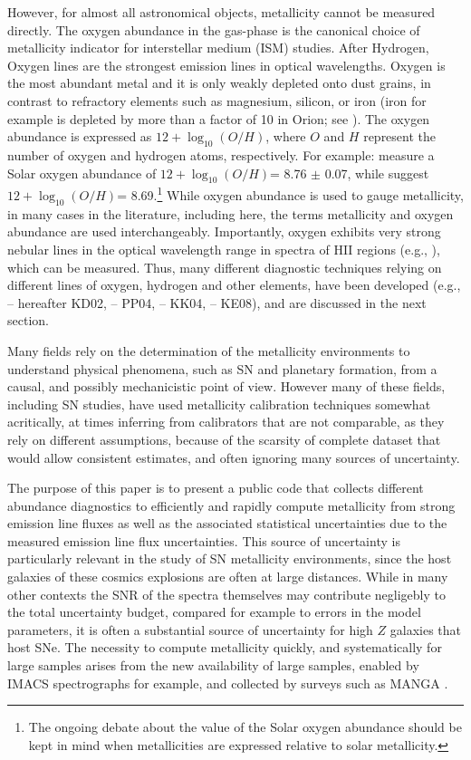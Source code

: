 \documentclass{emulateapj} \usepackage{amsmath} \usepackage{float}
\newcommand{\oxabinline}{\ensuremath{12 + \log_{10}(O/H)}}
\begin{document}
However, for almost all astronomical objects, metallicity cannot be
measured directly. The oxygen abundance in the gas-phase is the
canonical choice of metallicity indicator for interstellar medium
(ISM) studies. After Hydrogen, Oxygen lines are the strongest emission
lines in optical wavelengths. Oxygen is the most abundant metal and it
is only weakly depleted onto dust grains, in contrast to refractory
elements such as magnesium, silicon, or iron (iron for example is
depleted by more than a factor of 10 in Orion; see
\citealt{simondiaz11-orion}). The oxygen abundance is expressed as
\oxabinline, where $O$ and $H$ represent the number of oxygen and
hydrogen atoms, respectively. For example: \citealt{chaffau11} measure
a Solar oxygen abundance of \oxabinline = 8.76 $\pm$ 0.07, while
\citet{asplund09_rev} suggest \oxabinline = 8.69.\footnote{The ongoing
  debate about the value of the Solar oxygen abundance should be kept
  in mind when metallicities are expressed relative to solar
  metallicity.}  While oxygen abundance is used to gauge metallicity,
in many cases in the literature, including here, the terms metallicity
and oxygen abundance are used interchangeably.  Importantly, oxygen
exhibits very strong nebular lines in the optical wavelength range in
spectra of HII regions (e.g.,
\citealt{pagel79,osterbrock89,tremonti04}), which can be
measured. Thus, many different diagnostic techniques relying on
different lines of oxygen, hydrogen and other elements, have been
developed (e.g., \citealt{kewley02} -- hereafter KD02,
\citealt{pettini04} -- PP04, \citealt{kobulnicky04} -- KK04,
\citealt{kewley08} -- KE08), and are discussed in the next section.

Many fields rely on the determination of the metallicity environments
to understand physical phenomena, such as SN and planetary formation,
from a causal, and possibly mechanicistic point of view. However many
of these fields, including SN studies, have used metallicity
calibration techniques somewhat acritically, at times inferring from
calibrators that are not comparable, as they rely on different
assumptions, because of the scarsity of complete dataset that would
allow consistent estimates, and often ignoring many sources of
uncertainty.

The purpose of this paper is to present a public code that collects
different abundance diagnostics to efficiently and rapidly compute
metallicity from strong emission line fluxes as well as the associated
statistical uncertainties due to the measured emission line flux
uncertainties. This source of uncertainty is particularly relevant in
the study of SN metallicity environments, since the host galaxies of
these cosmics explosions are often at large distances. While in many
other contexts the SNR of the spectra themselves may contribute
negligebly to the total uncertainty budget, compared for example to
errors in the model parameters, it is often a substantial source of
uncertainty for high $Z$ galaxies that host SNe.  The necessity to
compute metallicity quickly, and systematically for large samples
arises from the new availability of large samples, enabled by IMACS
spectrographs for example, and collected by surveys such as MANGA
\citep{Bundy15}.
\end{document}
